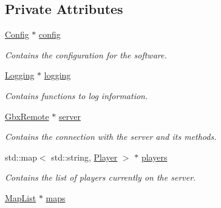 \subsection*{Private Attributes}
\begin{DoxyCompactItemize}
\item 
\hypertarget{classManiaPP_a9a91437fa70afd52c2dce19298888e36}{\hyperlink{classConfig}{Config} $\ast$ \hyperlink{classManiaPP_a9a91437fa70afd52c2dce19298888e36}{config}}\label{classManiaPP_a9a91437fa70afd52c2dce19298888e36}

\begin{DoxyCompactList}\small\item\em Contains the configuration for the software. \end{DoxyCompactList}\item 
\hypertarget{classManiaPP_aa4cea090301bdf0bf652ad377e7b01c0}{\hyperlink{classLogging}{Logging} $\ast$ \hyperlink{classManiaPP_aa4cea090301bdf0bf652ad377e7b01c0}{logging}}\label{classManiaPP_aa4cea090301bdf0bf652ad377e7b01c0}

\begin{DoxyCompactList}\small\item\em Contains functions to log information. \end{DoxyCompactList}\item 
\hypertarget{classManiaPP_ab81311d6901990cb99a7a30e0cbaab11}{\hyperlink{classGbxRemote}{Gbx\-Remote} $\ast$ \hyperlink{classManiaPP_ab81311d6901990cb99a7a30e0cbaab11}{server}}\label{classManiaPP_ab81311d6901990cb99a7a30e0cbaab11}

\begin{DoxyCompactList}\small\item\em Contains the connection with the server and its methods. \end{DoxyCompactList}\item 
\hypertarget{classManiaPP_a45712ccfa91b20242b39cb1164d305d8}{std\-::map$<$ std\-::string, \hyperlink{structPlayer}{Player} $>$ $\ast$ \hyperlink{classManiaPP_a45712ccfa91b20242b39cb1164d305d8}{players}}\label{classManiaPP_a45712ccfa91b20242b39cb1164d305d8}

\begin{DoxyCompactList}\small\item\em Contains the list of players currently on the server. \end{DoxyCompactList}\item 
\hypertarget{classManiaPP_a23c7e0ba8cf5fd45129b6a7a0fbe359b}{\hyperlink{classMapList}{Map\-List} $\ast$ \hyperlink{classManiaPP_a23c7e0ba8cf5fd45129b6a7a0fbe359b}{maps}}\label{classManiaPP_a23c7e0ba8cf5fd45129b6a7a0fbe359b}


\end{DoxyCompactItemize}
